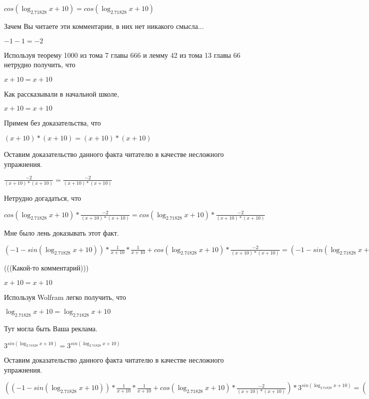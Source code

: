 \documentclass[12pt,a4paper,fleqn]{article}
\theoremstyle{definition}
\begin{document}
$cos(\log_{ 2.71828 }{ x  +  10 }) = cos(\log_{ 2.71828 }{ x  +  10 })$

Зачем Вы читаете эти комментарии, в них нет никакого смысла... 

$ -1  -  1  =  -2 $

Используя теорему 1000 из тома 7 главы 666 и лемму 42 из тома 13 главы 66 нетрудно получить, что 

$ x  +  10  =  x  +  10 $

Как рассказывали в начальной школе, 

$ x  +  10  =  x  +  10 $

Примем без доказательства, что 

$( x  +  10 ) * ( x  +  10 ) = ( x  +  10 ) * ( x  +  10 )$

Оставим доказательство данного факта читателю в качестве несложного упражнения. 

$\frac{ -2 }{( x  +  10 ) * ( x  +  10 )}
 = \frac{ -2 }{( x  +  10 ) * ( x  +  10 )}
$

Нетрудно догадаться, что 

$cos(\log_{ 2.71828 }{ x  +  10 }) * \frac{ -2 }{( x  +  10 ) * ( x  +  10 )}
 = cos(\log_{ 2.71828 }{ x  +  10 }) * \frac{ -2 }{( x  +  10 ) * ( x  +  10 )}
$

Мне было лень доказывать этот факт.

$( -1  - sin(\log_{ 2.71828 }{ x  +  10 })) * \frac{ 1 }{ x  +  10 }
 * \frac{ 1 }{ x  +  10 }
 + cos(\log_{ 2.71828 }{ x  +  10 }) * \frac{ -2 }{( x  +  10 ) * ( x  +  10 )}
 = ( -1  - sin(\log_{ 2.71828 }{ x  +  10 })) * \frac{ 1 }{ x  +  10 }
 * \frac{ 1 }{ x  +  10 }
 + cos(\log_{ 2.71828 }{ x  +  10 }) * \frac{ -2 }{( x  +  10 ) * ( x  +  10 )}
$

(((Какой-то комментарий))) 

$ x  +  10  =  x  +  10 $

Используя Wolfram легко получить, что 

$\log_{ 2.71828 }{ x  +  10 } = \log_{ 2.71828 }{ x  +  10 }$

Тут могла быть Ваша реклама. 

${ 3 }^{sin(\log_{ 2.71828 }{ x  +  10 })} = { 3 }^{sin(\log_{ 2.71828 }{ x  +  10 })}$

Оставим доказательство данного факта читателю в качестве несложного упражнения. 

$(( -1  - sin(\log_{ 2.71828 }{ x  +  10 })) * \frac{ 1 }{ x  +  10 }
 * \frac{ 1 }{ x  +  10 }
 + cos(\log_{ 2.71828 }{ x  +  10 }) * \frac{ -2 }{( x  +  10 ) * ( x  +  10 )}
) * { 3 }^{sin(\log_{ 2.71828 }{ x  +  10 })} = (( -1  - sin(\log_{ 2.71828 }{ x  +  10 })) * \frac{ 1 }{ x  +  10 }
 * \frac{ 1 }{ x  +  10 }
 + cos(\log_{ 2.71828 }{ x  +  10 }) * \frac{ -2 }{( x  +  10 ) * ( x  +  10 )}
) * { 3 }^{sin(\log_{ 2.71828 }{ x  +  10 })}$
\end{document}
